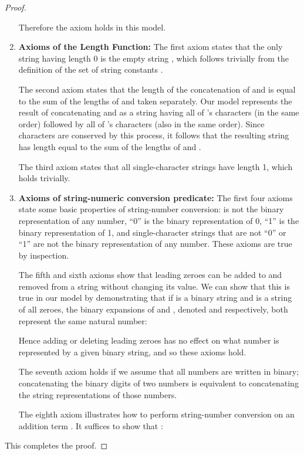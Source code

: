 \begin{proof}
\begin{enumerate}
  Therefore the axiom holds in this model.


\item \textbf{Axioms of the Length Function:} The first axiom states
  that the only string having length 0 is the empty string ,
  which follows trivially from the definition of the set of string
  constants .

  The second axiom states that the length of the concatenation of 
  and  is equal to the sum of the lengths of  and  taken
  separately.  Our model represents the result of concatenating 
  and  as a string having all of 's characters (in the same
  order) followed by all of 's characters (also in the same
  order). Since characters are conserved by this process, it follows
  that the resulting string has length equal to the sum of the lengths
  of  and .

  The third axiom states that all single-character strings have length
  1, which holds trivially.


\item \textbf{Axioms of  string-numeric conversion predicate:}
  The first four axioms state some basic properties of string-number
  conversion:  is not the binary representation of any
  number, ``0'' is the binary representation of 0, ``1'' is the binary
  representation of 1, and single-character strings that are not ``0''
  or ``1'' are not the binary representation of any number. These
  axioms are true by inspection.

  The fifth and sixth axioms show that leading zeroes can be added to and removed from
  a string without changing its value. 
   We can show that this is true in our model by demonstrating that if  is a binary string and  is a string of all zeroes,
   the binary expansions of  and , denoted  and  respectively, both represent the same natural number:
  
   
  
  Hence adding or deleting leading zeroes has no effect on what number is represented by a given binary string, and so these axioms hold.
  
  The seventh axiom holds if we assume that all numbers are written in binary;
  concatenating the binary digits of two numbers is equivalent to
  concatenating the string representations of those numbers.
  


  The eighth axiom illustrates how to perform string-number conversion
  on an addition term .  It suffices to show
  that :

  

  \end{enumerate}
  
This completes the proof.
\end{proof}


